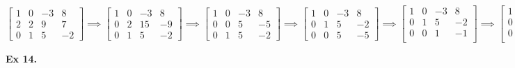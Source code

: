 \documentclass{article}
\begin{document}
$
\begin{bmatrix}
1 &0 &-3 &8\\
2 &2 &9 &7\\
0 &1 &5 &-2
\end{bmatrix}
\implies
\begin{bmatrix}
1 &0 &-3 &8\\
0 &2 &15 &-9\\
0 &1 &5 &-2
\end{bmatrix}
\implies
\begin{bmatrix}
1 &0 &-3 &8\\
0 &0 &5 &-5\\
0 &1 &5 &-2
\end{bmatrix}
\implies
\begin{bmatrix}
1 &0 &-3 &8\\
0 &1 &5 &-2\\
0 &0 &5 &-5
\end{bmatrix}
\implies
\begin{bmatrix}
1 &0 &-3 &8\\
0 &1 &5 &-2\\
0 &0 &1 &-1\\
\end{bmatrix}
\implies
\begin{bmatrix}
1 &0 &-3 &8\\
0 &1 &0 &3\\
0 &0 &1 &-1\\
\end{bmatrix}
\implies
\begin{bmatrix}
1 &0 &0 &5\\
0 &1 &0 &3\\
0 &0 &1 &-1\\
\end{bmatrix}
\implies x_1=5, x_2=3, x_3=-1
$

\textbf{Ex 14.}
\end{document}

